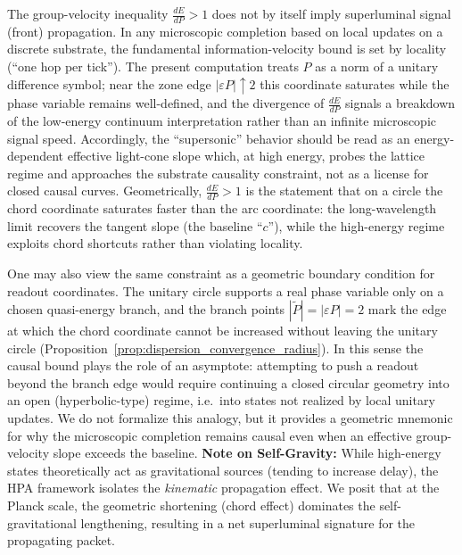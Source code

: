 \begin{remark}
\label{rem:causality_defense}
The group-velocity inequality $\frac{dE}{dP}>1$ does not by itself imply superluminal signal (front) propagation.
In any microscopic completion based on local updates on a discrete substrate, the fundamental information-velocity bound is set by locality (``one hop per tick'').
The present computation treats $P$ as a norm of a unitary difference symbol; near the zone edge $|\varepsilon P|\uparrow 2$ this coordinate saturates while the phase variable remains well-defined, and the divergence of $\frac{dE}{dP}$ signals a breakdown of the low-energy continuum interpretation rather than an infinite microscopic signal speed.
Accordingly, the ``supersonic'' behavior should be read as an energy-dependent effective light-cone slope which, at high energy, probes the lattice regime and approaches the substrate causality constraint, not as a license for closed causal curves.
Geometrically, $\frac{dE}{dP}>1$ is the statement that on a circle the chord coordinate saturates faster than the arc coordinate: the long-wavelength limit recovers the tangent slope (the baseline ``$c$''), while the high-energy regime exploits chord shortcuts rather than violating locality.
\par
\noindent One may also view the same constraint as a geometric boundary condition for readout coordinates. The unitary circle supports a real phase variable only on a chosen quasi-energy branch, and the branch points $|\tilde P|=|\varepsilon P|=2$ mark the edge at which the chord coordinate cannot be increased without leaving the unitary circle (Proposition~\ref{prop:dispersion_convergence_radius}). In this sense the causal bound plays the role of an asymptote: attempting to push a readout beyond the branch edge would require continuing a closed circular geometry into an open (hyperbolic-type) regime, i.e.\ into states not realized by local unitary updates. We do not formalize this analogy, but it provides a geometric mnemonic for why the microscopic completion remains causal even when an effective group-velocity slope exceeds the baseline.
\textbf{Note on Self-Gravity:} While high-energy states theoretically act as gravitational sources (tending to increase delay), the HPA framework isolates the \emph{kinematic} propagation effect. We posit that at the Planck scale, the geometric shortening (chord effect) dominates the self-gravitational lengthening, resulting in a net superluminal signature for the propagating packet.
\end{remark}


